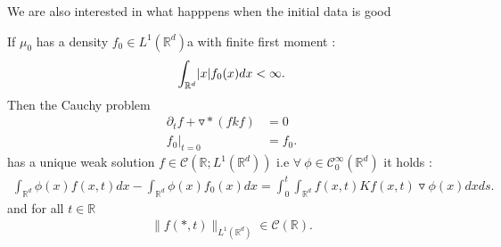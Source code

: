 We are also interested in what happpens when the initial data is good
\begin{corollary}
 If $\mu_{0}$  has a density  $f_{0} \in  L^{1}(\mathbb{R}^{d} ) $a with finite first moment : 
 \begin{align*}
   \int_{\mathbb{R}^{d} } \lvert x\rvert f_{0}(x) dx < \infty
 .\end{align*}
 Then the Cauchy problem 
 \begin{align*}
   \partial_t f  + \triangledown * (fkf) &= 0  \\
   f_0 \vert_{t=0} &= f_{0}
 .\end{align*}
 has a unique weak solution $f \in  \mathcal{C}(\mathbb{R};L^{1}(\mathbb{R}^{d} ) )$ i.e $\forall \ \phi  \in  \mathcal{C}_0^{\infty}(\mathbb{R}^{d} ) $ it holds : 
 \begin{align*}
   \int_{\mathbb{R}^{d} }\phi(x) f(x,t) dx - \int_{\mathbb{R}^{d} }\phi(x) f_0(x) dx = \int_0^{t} \int_{\mathbb{R}^{d} } f(x,t)Kf(x,t) \triangledown \phi(x) dx ds
 .\end{align*}
 and  for all $t \in  \mathbb{R}$
 \begin{align*}
   \|f(*,t)\|_{L^{1}(\mathbb{R}^{d} ) } \in  \mathcal{C}(\mathbb{R})
 .\end{align*}
\end{corollary}
